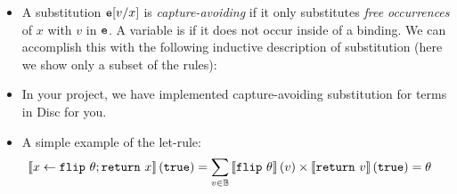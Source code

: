 \documentclass{tufte-handout}
\begin{document}
\begin{itemize}
\item A substitution $\texttt{e}[v/x]$ is \emph{capture-avoiding} if it only
substitutes \emph{free occurrences} of $x$ with $v$ in $\texttt{e}$. 
A variable is  if it does not occur inside of a binding.
We can 
accomplish this with the following inductive description of substitution
(here we show only a subset of the rules):


  \item In your project, we have implemented capture-avoiding substitution for terms in Disc 
  for you.

\item A simple example of the let-rule:
\begin{align*}
  \left \llbracket {x \leftarrow \texttt{flip}~\theta; \texttt{return}~x} \right \rrbracket(\texttt{true}) &= 
  \sum_{v \in \mathbb{B}} \left \llbracket {\texttt{flip}~\theta} \right \rrbracket(v) \times \left \llbracket {\texttt{return}~v} \right \rrbracket(\texttt{true}) 
  = \theta
\end{align*}


\end{itemize}

\end{document}
